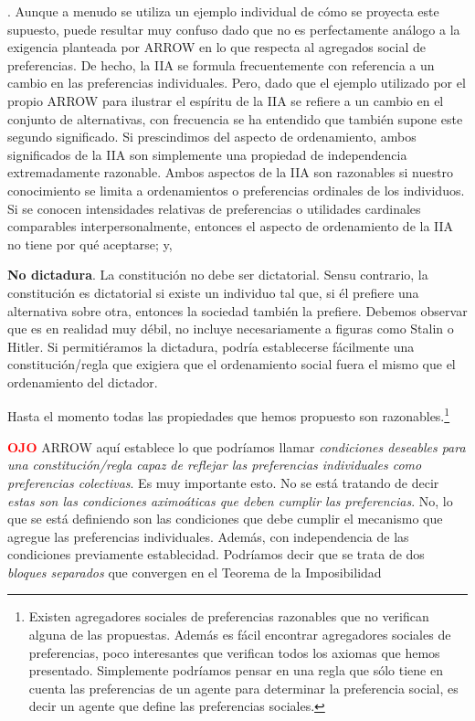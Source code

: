 \documentclass[10pt,a4paper]{article}
\newcounter{numitem}
\newenvironment{lnum}
      {\begin{list}{\arabic{numitem}.}{%
          \usecounter{numitem}%
          \setlength{\leftmargin}{1cm}%
          \setlength{\parskip}{3pt}%
          \setlength{\itemsep}{0pt}%
          \setlength{\parsep}{0pt}%
      }}
      {\end{list}}
\begin{document}
\begin{lnum}
{    Aunque a menudo se utiliza un ejemplo individual de cómo se proyecta este supuesto, puede resultar muy confuso dado que no es perfectamente análogo a la exigencia planteada por ARROW en lo que respecta al agregados social de preferencias. De hecho, la IIA se formula frecuentemente con referencia a un cambio en las preferencias individuales. Pero, dado que el ejemplo utilizado por el propio ARROW para ilustrar el espíritu de la IIA se refiere a un cambio en el conjunto de alternativas, con frecuencia se ha entendido que también supone este segundo significado. Si prescindimos del aspecto de ordenamiento, ambos significados de la IIA son simplemente una propiedad de independencia extremadamente razonable.
    } Ambos aspectos de la IIA son razonables si nuestro conocimiento se limita a ordenamientos o preferencias ordinales de los individuos. Si se conocen intensidades relativas de preferencias o utilidades cardinales comparables interpersonalmente, entonces el aspecto de ordenamiento de la IIA no tiene por qué aceptarse; y,
    \item \textbf{No dictadura}. La constitución no debe ser dictatorial. Sensu contrario, la constitución es dictatorial si existe un individuo tal que, si él prefiere una alternativa sobre otra, entonces la sociedad también la prefiere. Debemos observar que es en realidad muy débil, no incluye necesariamente a figuras como Stalin o Hitler. Si permitiéramos la dictadura, podría establecerse fácilmente una constitución/regla que exigiera que el ordenamiento social fuera el mismo que el ordenamiento del dictador.
\end{lnum}

Hasta el momento todas las propiedades que hemos propuesto son razonables.\footnote{%
    Existen agregadores sociales de preferencias razonables que no verifican alguna de las propuestas. Además es fácil encontrar agregadores sociales de preferencias, poco interesantes que verifican todos los axiomas que hemos presentado. Simplemente podríamos pensar en una regla que sólo tiene en cuenta las preferencias de un agente para determinar la preferencia social, es decir un agente que define las preferencias sociales.
}

\textcolor{red}{\textbf{OJO}} ARROW aquí establece lo que podríamos llamar \textit{condiciones deseables para una constitución/regla capaz de reflejar las preferencias individuales como preferencias colectivas}. Es muy importante esto. No se está tratando de decir \textit{estas son las condiciones aximoáticas que deben cumplir las preferencias}. No, lo que se está definiendo son las condiciones que debe cumplir el mecanismo que agregue las preferencias individuales. Además, con independencia de las condiciones previamente establecidad. Podríamos decir que se trata de dos \textit{bloques separados} que convergen en el Teorema de la Imposibilidad
\end{document}
